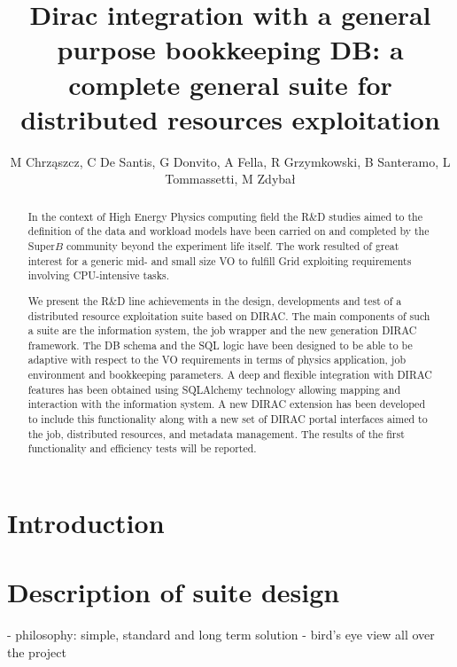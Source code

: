\documentclass[a4paper]{jpconf}
\begin{document}
\title{Dirac integration with a general purpose bookkeeping DB: a complete general suite for distributed resources exploitation}

\author{M Chrząszcz, C De Santis, G Donvito, A Fella, R Grzymkowski, B Santeramo, L Tommassetti, M Zdybał}

%
%
%
%
%

\begin{abstract}
In the context of High Energy Physics computing field the R\&D studies aimed to
the definition of the data and workload models have been carried on and 
completed by the Super$B$ community beyond the experiment life itself.
The work resulted of great interest for a generic mid- and small size VO to 
fulfill Grid exploiting requirements involving CPU-intensive tasks.

We present the R\&D line achievements in the design, developments and test of a
distributed resource exploitation suite based on DIRAC. The main components of
such a suite are the information system, the job wrapper and the new generation
DIRAC framework. The DB schema and the SQL logic have been designed to be able
to be adaptive with respect to the VO requirements in terms of physics 
application, job environment and bookkeeping parameters. A deep and flexible 
integration with DIRAC features has been obtained using SQLAlchemy technology
allowing mapping and interaction with the information system. A new DIRAC
extension has been developed to include this functionality along with a new set
of DIRAC portal interfaces aimed to the job, distributed resources, and
metadata management. The results of the first functionality and efficiency
tests will be reported.
\end{abstract}

\section{Introduction}

\section{Description of suite design}
- philosophy: simple, standard and long term solution
- bird's eye view all over the project
\end{document}
